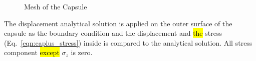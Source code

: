 \begin{figure}[h!]
    \centering
    \begin{subfigure}[b]{1\linewidth}
        \centering
    \end{subfigure}
    \begin{subfigure}[b]{1\linewidth}
        \centering
    \end{subfigure}
    \caption{Mesh of the Capsule}
    \label{oct_fig:ex_caplus_mesh1.png}
\end{figure}
%
The displacement analytical solution \citep{Tim1951} is applied on the outer surface of the capsule as the boundary condition and the displacement and \hl{the} stress (Eq.~\ref{eqn:caplus_stress}) inside is compared to the analytical solution.
All stress component \hl{except} $\sigma_z$ is zero.

